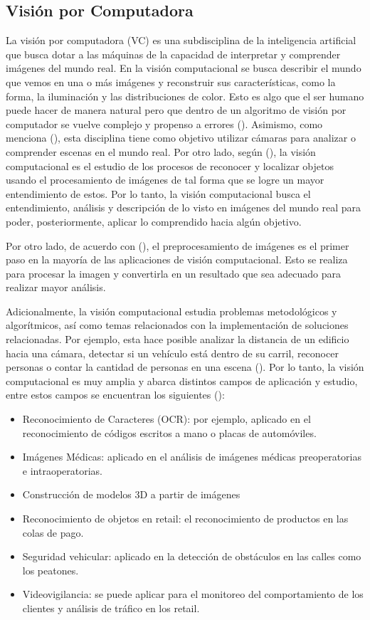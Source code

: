\subsection{Visión por Computadora}
La visión por computadora (VC) es una subdisciplina de la inteligencia artificial que busca dotar a las máquinas de la capacidad de interpretar y comprender imágenes del mundo real. En la visión computacional se busca describir el mundo que vemos en una o más imágenes y reconstruir sus características, como la forma, la iluminación y las distribuciones de color. 
Esto es algo que el ser humano puede hacer de manera natural pero que dentro de un algoritmo de visión por computador se vuelve complejo y propenso a errores (\cite{szeliski2010computer}). Asimismo, como menciona (\cite{klette2010computer}), esta disciplina tiene como objetivo utilizar cámaras para analizar o comprender escenas en el mundo real. 
Por otro lado, según (\cite{sucar2008vision}), la visión computacional es el estudio de los procesos de reconocer y localizar objetos usando el procesamiento de imágenes de tal forma que se logre un mayor entendimiento de estos. Por lo tanto, la visión computacional busca el entendimiento, análisis y descripción de lo visto en imágenes del mundo real para poder, posteriormente, aplicar lo comprendido hacia algún objetivo. 

Por otro lado, de acuerdo con (\cite{szeliski2010computer}), el preprocesamiento de imágenes es el primer paso en la mayoría de las aplicaciones de visión computacional. Esto se realiza para procesar la imagen y convertirla en un resultado que sea adecuado para realizar mayor análisis.

Adicionalmente, la visión computacional estudia problemas metodológicos y algorítmicos, así como temas relacionados con la implementación de soluciones relacionadas. Por ejemplo, esta hace posible analizar la distancia de un edificio hacia una cámara, detectar si un vehículo está dentro de su carril, reconocer personas o contar la cantidad de personas en una escena (\cite{klette2014concise}). Por lo tanto, la visión computacional es muy amplia y abarca distintos campos de aplicación y estudio, entre estos campos se encuentran los siguientes (\cite{szeliski2010computer}): 

\begin{itemize}
    \item Reconocimiento de Caracteres (OCR): por ejemplo, aplicado en el reconocimiento 
de códigos escritos a mano o placas de automóviles.
    \item Imágenes Médicas: aplicado en el análisis de imágenes médicas preoperatorias e 
intraoperatorias.
    \item Construcción de modelos 3D a partir de imágenes
    \item Reconocimiento de objetos en retail: el reconocimiento de productos en las colas de pago.  
    \item Seguridad vehicular: aplicado en la detección de obstáculos en las calles como los peatones.
    \item Videovigilancia: se puede aplicar para el monitoreo del comportamiento de los clientes y análisis de tráfico en los retail.
\end{itemize}

